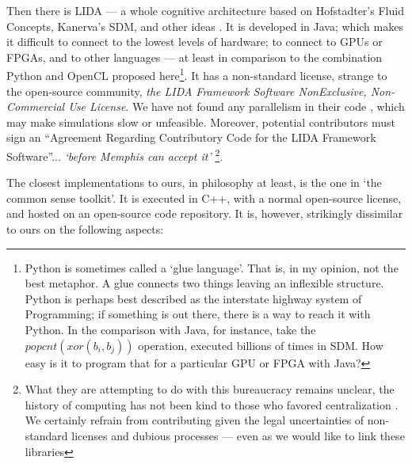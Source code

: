 Then there is LIDA --- a whole cognitive architecture based on Hofstadter's Fluid Concepts, Kanerva's SDM, and other ideas \citep{Anwar2003, snaider_integer_2013, snaider_modular_2014, franklin_lida:_2014}.  It is developed in Java; which makes it difficult to connect to the lowest levels of hardware; to connect to GPUs or FPGAs, and to other languages --- at least in comparison to the combination Python and OpenCL proposed here\footnote{Python is sometimes called a `glue language'. That is, in my opinion, not the best metaphor.  A glue connects two things leaving an inflexible structure.  Python is perhaps best described as the interstate highway system of Programming; if something is out there, there is a way to reach it with Python.  In the comparison with Java, for instance, take the $popcnt(xor(b_i,b_j))$ operation, executed billions of times in SDM. How easy is it to program that for a particular GPU or FPGA with Java?}.  It has a non-standard license, strange to the open-source community, \emph{the LIDA Framework Software NonExclusive, Non-Commercial Use License}.  We have not found any parallelism in their code \citep{ccrg_ccrg_nodate}, which may make simulations slow or unfeasible. Moreover, potential contributors must sign an ``Agreement Regarding Contributory Code for the LIDA Framework Software''... \emph{`before Memphis can accept it'} \footnote{What they are attempting to do with this bureaucracy remains unclear, the history of computing has not been kind to those who favored centralization \citep{ferguson_computer_2002}.  We certainly refrain from contributing given the legal uncertainties of non-standard licenses and dubious processes --- even as we would like to link these libraries}.

The closest implementations to ours, in philosophy at least, is the one in `the common sense toolkit'. It is executed in C++, with a normal open-source license, and hosted on an open-source code repository.  It is, however, strikingly dissimilar to ours on the following aspects:

